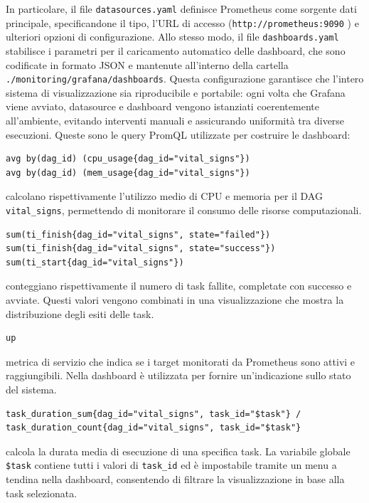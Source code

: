In particolare, il file \texttt{datasources.yaml} definisce Prometheus come sorgente dati principale, specificandone il tipo, l’URL di accesso (\texttt{http://prometheus:9090}
) e ulteriori opzioni di configurazione. Allo stesso modo, il file \texttt{dashboards.yaml} stabilisce i parametri per il caricamento automatico delle dashboard, che sono codificate in formato JSON e mantenute all’interno della cartella\\ \texttt{./monitoring/grafana/dashboards}.
Questa configurazione garantisce che l’intero sistema di visualizzazione sia riproducibile e portabile: ogni volta che Grafana viene avviato, datasource e dashboard vengono istanziati coerentemente all’ambiente, evitando interventi manuali e assicurando uniformità tra diverse esecuzioni.
Queste sono le query PromQL utilizzate per costruire le dashboard:
\begin{verbatim}
avg by(dag_id) (cpu_usage{dag_id="vital_signs"})
avg by(dag_id) (mem_usage{dag_id="vital_signs"})
\end{verbatim}
calcolano rispettivamente l'utilizzo medio di CPU e memoria per il DAG \texttt{vital\_signs}, permettendo di monitorare il consumo delle risorse computazionali.

\begin{verbatim}
sum(ti_finish{dag_id="vital_signs", state="failed"})
sum(ti_finish{dag_id="vital_signs", state="success"})
sum(ti_start{dag_id="vital_signs"})
\end{verbatim}
conteggiano rispettivamente il numero di task fallite, completate con successo e avviate. Questi valori vengono combinati in una visualizzazione che mostra la distribuzione degli esiti delle task.

\begin{verbatim}
up
\end{verbatim}
metrica di servizio che indica se i target monitorati da Prometheus sono attivi e raggiungibili. Nella dashboard è utilizzata per fornire un'indicazione sullo stato del sistema.

\begin{verbatim}
task_duration_sum{dag_id="vital_signs", task_id="$task"} / 
task_duration_count{dag_id="vital_signs", task_id="$task"}
\end{verbatim}
calcola la durata media di esecuzione di una specifica task. La variabile globale \texttt{\$task} contiene tutti i valori di \texttt{task\_id} ed è impostabile tramite un menu a tendina nella dashboard, consentendo di filtrare la visualizzazione in base alla task selezionata.


